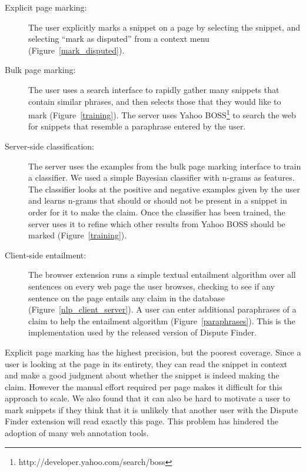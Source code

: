 \documentclass{www2010-accepted}
\newcommand{\todo}[1]{}
\begin{document}
\label{sec:explicit_mark}
\begin{description}
\item[Explicit page marking:] The user explicitly marks a snippet on a page by selecting the snippet, and selecting ``mark as disputed'' from a context menu (Figure~\ref{mark_disputed}).

\item[Bulk page marking:] The user uses a search interface to rapidly gather many snippets that contain similar phrases, and then selects those that they would like to mark (Figure~\ref{training}). The server uses Yahoo BOSS\footnote{http://developer.yahoo.com/search/boss} to search the web for snippets that resemble a paraphrase entered by the user. 

\item[Server-side classification:] The server uses the examples from the bulk page marking interface to train a classifier. We used a simple Bayesian classifier with n-grams as features. The classifier looks at the positive and negative examples given by the user and learns n-grams that should or should not be present in a snippet in order for it to make the claim.  Once the classifier has been trained, the server uses it to refine which other results from Yahoo BOSS should be marked (Figure~\ref{training}).

\todo{Should we say that we didn't completely finish this version?}

\todo{Has anyone done something like this before.}
\todo{We only partially implemented this approach}

\item[Client-side entailment:] The browser extension runs a simple textual entailment algorithm over all sentences on every web page the user browses, checking to see if any sentence on the page entails any claim in the database (Figure~\ref{nlp_client_server}). A user can enter additional paraphrases of a claim to help the entailment algorithm (Figure~\ref{paraphrases}). This is the implementation used by the released version of Dispute Finder.
\end{description}

Explicit page marking has the highest precision, but the poorest coverage. Since a user is looking at the page in its entirety, they can read the snippet in context and make a good judgment about whether the snippet is indeed making the claim. However the manual effort required per page makes it difficult for this approach to scale. We also found that it can also be hard to motivate a user to mark snippets if they think that it is unlikely that another user with the Dispute Finder extension will read exactly this page. This problem has hindered the adoption of many web annotation tools.
\end{document}
